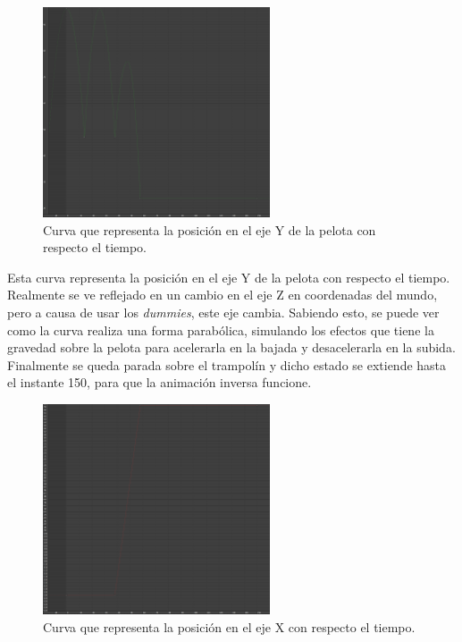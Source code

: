 \begin{figure}[H]
   \centering
   \includegraphics[width=0.6\textwidth]{imagenes/curvas/PL/pelota/green.png}
   \caption{Curva que representa la posición en el eje Y de la pelota con respecto el tiempo.}
\end{figure}

Esta curva representa la posición en el eje Y de la pelota con respecto el tiempo. Realmente se ve reflejado en un cambio en el eje Z en coordenadas del mundo, pero a causa de usar los \textit{dummies}, este eje cambia. Sabiendo esto, se puede ver como la curva realiza una forma parabólica, simulando los efectos que tiene la gravedad sobre la pelota para acelerarla en la bajada y desacelerarla en la subida. Finalmente se queda parada sobre el trampolín y dicho estado se extiende hasta el instante 150, para que la animación inversa funcione.

\begin{figure}[H]
   \centering
   \includegraphics[width=0.6\textwidth]{imagenes/curvas/PL/pelota/red.png}
   \caption{Curva que representa la posición en el eje X con respecto el tiempo.}
\end{figure}

